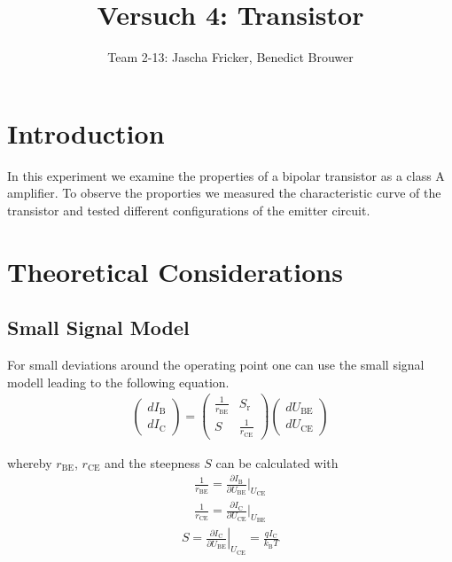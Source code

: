 \documentclass[11pt, a4paper]{article}
\title{Versuch 4: Transistor}
\author{Team 2-13: Jascha Fricker, Benedict Brouwer}
\begin{document}
    \maketitle

    \tableofcontents

    \newpage
\section{Introduction}
In this experiment we examine the properties of a bipolar transistor as a class A amplifier. To observe the proporties we measured the characteristic curve 
of the transistor and tested different configurations of the emitter circuit.
\section{Theoretical Considerations}

\FloatBarrier
\subsection{Small Signal Model}
For small deviations around the operating point one can use the small signal modell leading to the following equation.
\begin{align}
\left(\begin{array}{l}
    d I_{\mathrm{B}} \\
    d I_{\mathrm{C}}
    \end{array}\right)=\left(\begin{array}{cc}
    \frac{1}{r_{\mathrm{BE}}} & S_{\mathrm{r}} \\
    S & \frac{1}{r_{\mathrm{CE}}}
    \end{array}\right)\left(\begin{array}{l}
    d U_{\mathrm{BE}} \\
    d U_{\mathrm{CE}}
    \end{array}\right)
    \label{eq:ssm}
\end{align}

whereby $r_{\text{BE}}$, $r_{\text{CE}}$ and the steepness $S$ can be calculated with
\begin{align}
    \frac{1}{r_{\text{BE}}} = \frac{\partial I_{\text{B}}}{\partial U_{\text{BE}}} |_{U_{\text{CE}}} \label{eq:rbe} 
\end{align}
\begin{align}
    \frac{1}{r_{\text{CE}}} = \frac{\partial I_{\text{C}}}{\partial U_{\text{CE}}} |_{U_{\text{BE}}} \label{eq:rce} 
\end{align}
\begin{align}
    S=\left .\frac{\partial I_{\mathrm{C}}}{\partial U_{\mathrm{BE}}}\right |_{U_{\mathrm{CE}}}=\frac{q I_{\mathrm{C}}}{k_{\mathrm{B}} T} \label{eq:steep}
\end{align}
\end{document}
